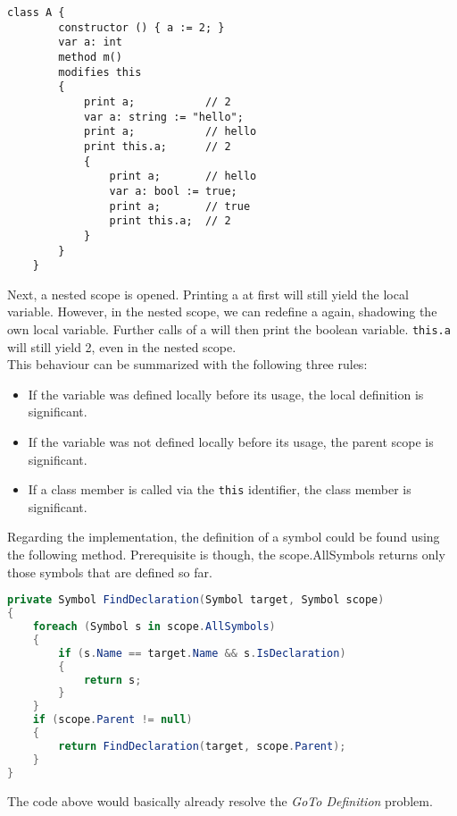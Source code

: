\begin{lstlisting}[caption={Complex Shadowing Example}, captionpos=b, label={lst:shadowing}]
    class A {
        constructor () { a := 2; }
        var a: int
        method m()
        modifies this
        {
            print a;           // 2
            var a: string := "hello";
            print a;           // hello
            print this.a;      // 2
            {
                print a;       // hello
                var a: bool := true;
                print a;       // true
                print this.a;  // 2
            }
        }
    }
\end{lstlisting}

Next, a nested scope is opened. Printing a at first will still yield the local variable. However, in the nested scope, we can redefine a again, shadowing the own local variable. Further calls of a will then print the boolean variable. \texttt{this.a} will still yield 2, even in the nested scope.\\

This behaviour can be summarized with the following three rules:
\begin{itemize}
    \item If the variable was defined locally before its usage, the local definition is significant.
    \item If the variable was not defined locally before its usage, the parent scope is significant.
    \item If a class member is called via the \texttt{this} identifier, the class member is significant.
\end{itemize}

Regarding the implementation, the definition of a symbol could be found using the following method. Prerequisite is though, the scope.AllSymbols returns only those symbols that are defined so far.


\begin{lstlisting}[language=csharp, caption={Finding Symbol Definition}, captionpos=b, label={lst:findsymbol}]
private Symbol FindDeclaration(Symbol target, Symbol scope)
{
    foreach (Symbol s in scope.AllSymbols)
    {
        if (s.Name == target.Name && s.IsDeclaration)
        {
            return s;
        }
    }
    if (scope.Parent != null)
    {
        return FindDeclaration(target, scope.Parent);
    }
}
\end{lstlisting}

The code above would basically already resolve the \textit{GoTo Definition} problem.

